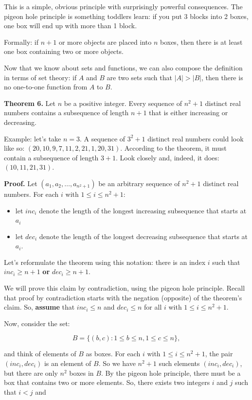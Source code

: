 \documentclass[a4paper, justified, notitlepage, sfsidenotes, notoc]{tufte-book}
\begin{document}
This is a simple, obvious principle with surprisingly powerful consequences. The pigeon hole principle is something toddlers learn: if you put 3 blocks into 2 boxes, one box will end up with more than 1 block.

Formally: if \(n+1\) or more objects are placed into \(n\) boxes, then there is at least one box containing two or more objects.

Now that we know about sets and functions, we can also compose the definition in terms of set theory: if \(A\) and \(B\) are two sets such that \(|A| > |B|\), then there is no one-to-one function from \(A\) to \(B\).

\textbf{Theorem 6.} Let \(n\) be a positive integer. Every sequence of \(n^{2}+1\) distinct real numbers contains a subsequence of length \(n+1\) that is either increasing or decreasing.

Example: let's take \(n = 3\). A sequence of \(3^{2}+1\) distinct real numbers could look like so: \((20, 10, 9, 7, 11, 2, 21, 1, 20, 31)\). According to the theorem, it must contain a subsequence of length \(3+1\). Look closely and, indeed, it does: \((10, 11, 21, 31)\).

\textbf{Proof.} Let \((a_{1}, a_{2}, \ldots ,a_{n^{2}+1})\) be an arbitrary sequence of \(n^{2}+1\) distinct real numbers. For each \(i\) with \(1 \leq i \leq n^{2} + 1\):

\begin{itemize}
\item let \(inc_{i}\) denote the length of the longest increasing subsequence that starts at \(a_{i}\)
\item let \(dec_{i}\) denote the length of the longest decreasing subsequence that starts at \(a_{i}\).
\end{itemize}

Let's reformulate the theorem using this notation: there is an index \(i\) such that \(inc_{i} \geq n+1\) \textbf{or} \(dec_{i} \geq n+1\).

We will prove this claim by contradiction, using the pigeon hole principle. Recall that proof by contradiction starts with the negation (opposite) of the theorem's claim. So, \textbf{assume} that \(inc_{i} \leq n\) and \(dec_{i} \leq n\) for all \(i\) with \(1 \leq i \leq n^{2} + 1\).

Now, consider the set:

$$ B = \{ (b,c) : 1 \leq b \leq n, 1 \leq c \leq n \}, $$

and think of elements of \(B\) as boxes. For each \(i\) with \(1 \leq i \leq n^{2} + 1\), the pair \((inc_{i}, dec_{i})\) is an element of \(B\). So we have \(n^{2} + 1\) such elements \((inc_{i}, dec_{i})\), but there are only \(n^{2}\) boxes in \(B\). By the pigeon hole principle, there must be a box that contains two or more elements. So, there exists two integers \(i\) and \(j\) such that \(i < j\) and
\end{document}
